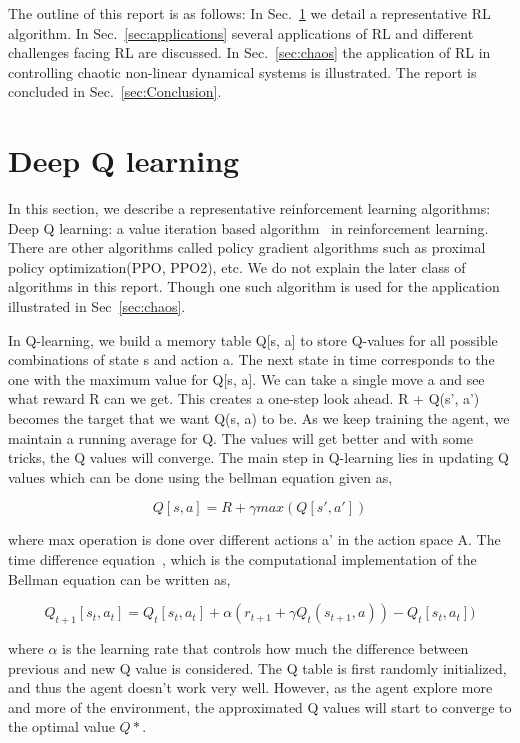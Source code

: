 \documentclass[aps, pre, reprint]{revtex4-1}
\newcommand{\be}{\begin{equation}}
\newcommand{\ee}{\end{equation}}
\begin{document}
The outline of this report is as follows: In Sec.~\ref{sec:Algos.}  we detail a representative RL algorithm. In Sec.~\ref{sec:applications} several applications of RL and different challenges facing RL are discussed. In Sec.~\ref{sec:chaos} the application of RL in controlling chaotic non-linear dynamical systems is illustrated. The report is concluded in Sec.~\ref{sec:Conclusion}.
     

\section{Deep Q learning}
\label{sec:Algos.}
In this section, we describe a representative reinforcement learning algorithms: Deep Q learning: a value iteration based algorithm~\cite{sutton2018reinforcement} in reinforcement learning. There are other algorithms called policy gradient algorithms such as proximal policy optimization(PPO, PPO2), etc. We do not explain the later class of algorithms in this report. Though one such algorithm is used for the application illustrated in Sec~\ref{sec:chaos}.

In Q-learning, we build a memory table Q[s, a] to store Q-values for all possible combinations of state s and action a. The next state in time corresponds to the one with the maximum value for Q[s, a]. We can take a single move a and see what reward R can we get. This creates a one-step look ahead. R + Q(s’, a’) becomes the target that we want Q(s, a) to be. As we keep training the agent, we maintain a running average for Q. The values will get better and with some tricks, the Q values will converge. The main step in Q-learning lies in updating Q values which can be done using the bellman equation given as,

\be
Q[s,a] = R + \gamma max (Q[s', a'])
\ee

where max operation is done over different actions a' in the action space A. The time difference equation~\cite{tesauro1995temporal}, which is the computational implementation of the Bellman equation can be written as,

\be
Q_{t+1}[s_t,a_t] = Q_t[s_t,a_t] + \alpha(r_{t+1} + \gamma Q_t(s_{t+1},a)) - Q_t[s_t,a_t])
\ee

where $\alpha$ is the learning rate that controls how much the difference between previous and new Q value is considered. The Q table is first randomly initialized, and thus the agent doesn't work very well. However, as the agent explore more and more of the environment, the approximated Q values will start to converge to the optimal value $Q*$.\\
\end{document}
